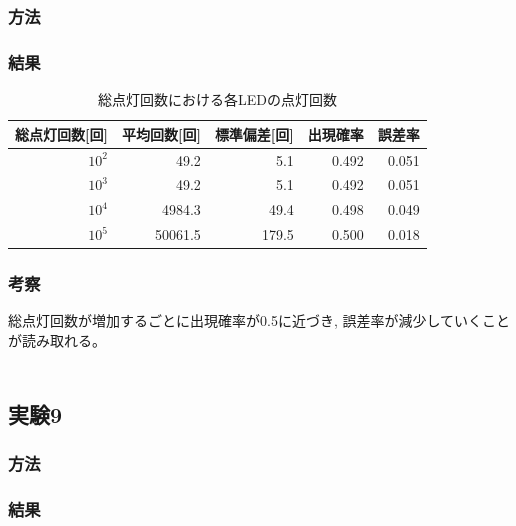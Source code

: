 \documentclass{jarticle}
\begin{document}
\subsubsection{方法}



\subsubsection{結果}
\begin{table}[h]
   \begin{center}

       \caption{総点灯回数における各LEDの点灯回数}
        \begin{tabular}{|r|r|r|r|r|}
         \hline
         総点灯回数[回] & 平均回数[回] & 標準偏差[回] & 出現確率 &誤差率\\
         \hline
         $10^2$ & 49.2  & 5.1 & 0.492 & 0.051\\
         $10^3$ & 49.2  & 5.1 & 0.492 & 0.051\\
         $10^4$ & 4984.3  & 49.4 & 0.498 & 0.049\\
         $10^5$ & 50061.5  & 179.5 & 0.500 & 0.018\\
         \hline
        \end{tabular}
       \label{table:Cs137}

   \end{center}
  \end{table}
  
\subsubsection{考察}
総点灯回数が増加するごとに出現確率が0.5に近づき,
誤差率が減少していくことが読み取れる。\\
\\

\subsection{実験9}
\subsubsection{方法}



\subsubsection{結果}
\end{document}
